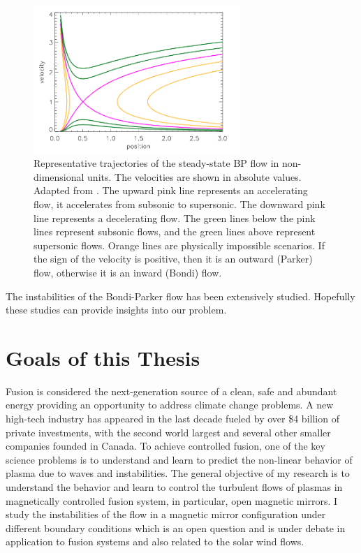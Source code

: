 \begin{figure}[htbp]
	\centering
	\includegraphics[width=0.7\textwidth]{figures/steady-state-BP-flow}
	\caption{Representative trajectories of the steady-state BP flow in non-dimensional units. The velocities are shown in absolute values. Adapted from \cite{keto_stability_2020}. The upward pink line represents an accelerating flow, it accelerates from subsonic to supersonic. The downward pink line represents a decelerating flow. The green lines below the pink lines represent subsonic flows, and the green lines above represent supersonic flows. Orange lines are physically impossible scenarios. If the sign of the velocity is positive, then it is an outward (Parker) flow, otherwise it is an inward (Bondi) flow.}
	\label{fig:BP-flow-velocity}
\end{figure}

The instabilities of the Bondi-Parker flow has been extensively studied. \cite{bondi_spherically_1952,velli_from_1994,velli_hydrodynamics_2001,del_dynamical_1998,keto_stability_2020} Hopefully these studies can provide insights into our problem.

\section{Goals of this Thesis}
Fusion is considered the next-generation source of a clean, safe and abundant energy providing an opportunity to address climate change problems. A new high-tech industry has appeared in the last decade fueled by over \$4 billion of private investments, with the second world largest and several other smaller companies founded in Canada. To achieve controlled fusion, one of the key science problems is to understand and learn to predict the non-linear behavior of plasma due to waves and instabilities. The general objective of my research is to understand the behavior and learn to control the turbulent flows of plasmas in magnetically controlled fusion system, in particular, open magnetic mirrors. I study the instabilities of the flow in a magnetic mirror configuration under different boundary conditions which is an open question and is under debate in application to fusion systems and also related to the solar wind flows.

